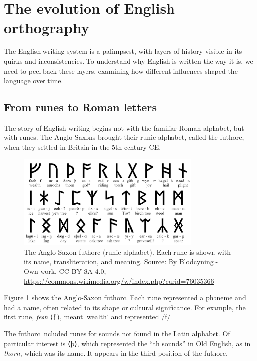 \section{The evolution of English orthography}

The English writing system is a palimpsest, with layers of history visible in its quirks and inconsistencies. To understand why English is written the way it is, we need to peel back these layers, examining how different influences shaped the language over time.

\subsection{From runes to Roman letters}

The story of English writing begins not with the familiar Roman alphabet, but with runes. The Anglo-Saxons brought their runic alphabet, called the futhorc, when they settled in Britain in the 5th century CE.

\begin{figure}[h]
\centering
\includegraphics[width=0.8\textwidth]{figures/Futhorc_Rune_Chart.png}
\caption{The Anglo-Saxon futhorc (runic alphabet). Each rune is shown with its name, transliteration, and meaning. Source: By Blodcyning - Own work, CC BY-SA 4.0, \url{https://commons.wikimedia.org/w/index.php?curid=76035366}}
\label{fig:futhorc}
\end{figure}

Figure \ref{fig:futhorc} shows the Anglo-Saxon futhorc. Each rune represented a phoneme and had a name, often related to its shape or cultural significance. For example, the first rune, \textit{feoh} ⟨ᚠ⟩, meant `wealth' and represented /f/. 

The futhorc included runes for sounds not found in the Latin alphabet. Of particular interest is ⟨þ⟩, which represented the ``th sounds'' in Old English, as in \textit{thorn}, which was its name. It appears in the third position of the futhorc.

